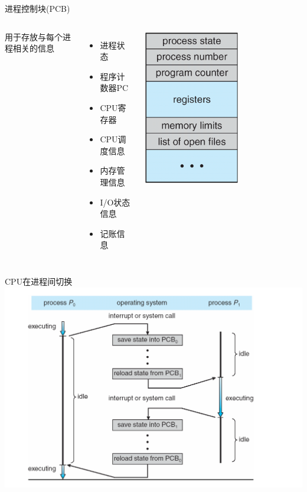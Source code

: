 \documentclass[xcolor=svgnames]{beamer}
\begin{document}
\begin{CJK*}{UTF8}{gbsn}
\begin{frame}{进程控制块(PCB)}
\begin{columns}%
用于存放与每个进程相关的信息
\begin{itemize}
\item 进程状态
\item 程序计数器PC
\item CPU寄存器
\item CPU调度信息
\item 内存管理信息
\item I/O状态信息
\item 记账信息
\end{itemize}
\includegraphics[width=0.6\textwidth]{PCB.png}
\end{columns}%
\end{frame}

\begin{frame}{CPU在进程间切换}
\includegraphics[width=1.0\textwidth]{switch.png}
\end{frame}


\end{CJK*}
\end{document}
